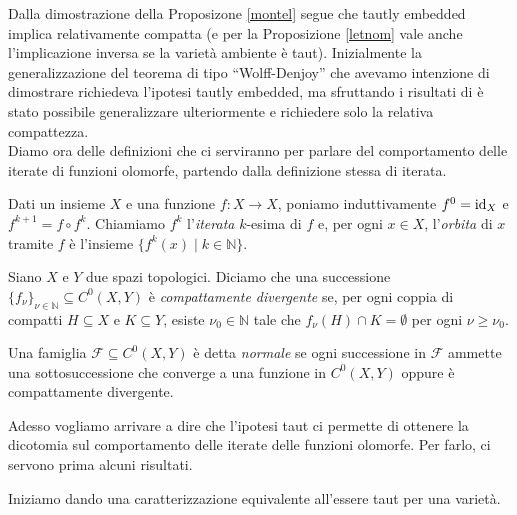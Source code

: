 Dalla dimostrazione della Proposizone \ref{montel} segue che tautly embedded implica relativamente compatta (e per la Proposizione \ref{letnom} vale anche l'implicazione inversa se la varietà ambiente è taut). Inizialmente la generalizzazione del teorema di tipo ``Wolff-Denjoy'' che avevamo intenzione di dimostrare richiedeva l'ipotesi tautly embedded, ma sfruttando i risultati di \cite{BZ2} è stato possibile generalizzare ulteriormente e richiedere solo la relativa compattezza.\\

Diamo ora delle definizioni che ci serviranno per parlare del comportamento delle iterate di funzioni olomorfe, partendo dalla definizione stessa di iterata.

\begin{defn}
    Dati un insieme $X$ e una funzione $f:X\longrightarrow X$, poniamo induttivamente $f^0=\operatorname{id}_X$ e $f^{k+1}=f\circ f^k$. Chiamiamo $f^k$ l'\textit{iterata} $k$-esima di $f$ e, per ogni $x \in X$, l'\textit{orbita} di $x$ tramite $f$ è l'insieme $\{f^k(x)\mid k \in \mathbb{N}\}$.
\end{defn}

\begin{defn}
    Siano $X$ e $Y$ due spazi topologici. Diciamo che una successione $\{f_{\nu}\}_{\nu \in \mathbb{N}} \subseteq C^0(X,Y)$ è \textit{compattamente divergente} se, per ogni coppia di compatti $H\subseteq X$ e $K\subseteq Y$, esiste $\nu_0 \in \mathbb{N}$ tale che $f_\nu(H)\cap K=\emptyset$ per ogni $\nu \ge \nu_0$.

    Una famiglia $\mathcal{F} \subseteq C^0(X,Y)$ è detta \textit{normale} se ogni successione in $\mathcal{F}$ ammette una sottosuccessione che converge a una funzione in $C^0(X,Y)$ oppure è compattamente divergente.
\end{defn}

Adesso vogliamo arrivare a dire che l'ipotesi taut ci permette di ottenere la dicotomia sul comportamento delle iterate delle funzioni olomorfe. Per farlo, ci servono prima alcuni risultati.

Iniziamo dando una caratterizzazione equivalente all'essere taut per una varietà.

